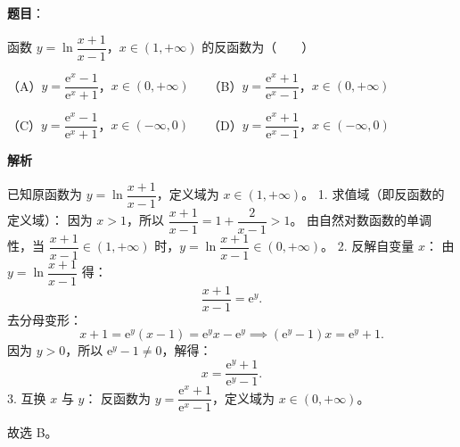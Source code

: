\begin{answer}

\textbf{题目}：

函数 $y = \ln\dfrac{x+1}{x-1}$，$x \in (1, +\infty)$ 的反函数为\mbox{（　　）}

（A）$y = \dfrac{\mathrm{e}^x - 1}{\mathrm{e}^x + 1}$，$x \in (0, +\infty)$　　（B）$y = \dfrac{\mathrm{e}^x + 1}{\mathrm{e}^x - 1}$，$x \in (0, +\infty)$

（C）$y = \dfrac{\mathrm{e}^x - 1}{\mathrm{e}^x + 1}$，$x \in (-\infty, 0)$　　（D）$y = \dfrac{\mathrm{e}^x + 1}{\mathrm{e}^x - 1}$，$x \in (-\infty, 0)$

\textbf{解析}

已知原函数为 $y = \ln\dfrac{x+1}{x-1}$，定义域为 $x \in (1, +\infty)$。
1. 求值域（即反函数的定义域）：
   因为 $x > 1$，所以 $\dfrac{x+1}{x-1} = 1 + \dfrac{2}{x-1} > 1$。
   由自然对数函数的单调性，当 $\dfrac{x+1}{x-1} \in (1, +\infty)$ 时，$y = \ln\dfrac{x+1}{x-1} \in (0, +\infty)$。
2. 反解自变量 $x$：
   由 $y = \ln\dfrac{x+1}{x-1}$ 得：
\nopagebreak[4]
\[\frac{x+1}{x-1} = \mathrm{e}^y.\]
   去分母变形：
\nopagebreak[4]
\[x + 1 = \mathrm{e}^y(x - 1) = \mathrm{e}^y x - \mathrm{e}^y \implies (\mathrm{e}^y - 1)x = \mathrm{e}^y + 1.\]
   因为 $y > 0$，所以 $\mathrm{e}^y - 1 \ne 0$，解得：
\nopagebreak[4]
\[x = \frac{\mathrm{e}^y + 1}{\mathrm{e}^y - 1}.\]
3. 互换 $x$ 与 $y$：
   反函数为 $y = \dfrac{\mathrm{e}^x + 1}{\mathrm{e}^x - 1}$，定义域为 $x \in (0, +\infty)$。

故选 B。


\end{answer}
